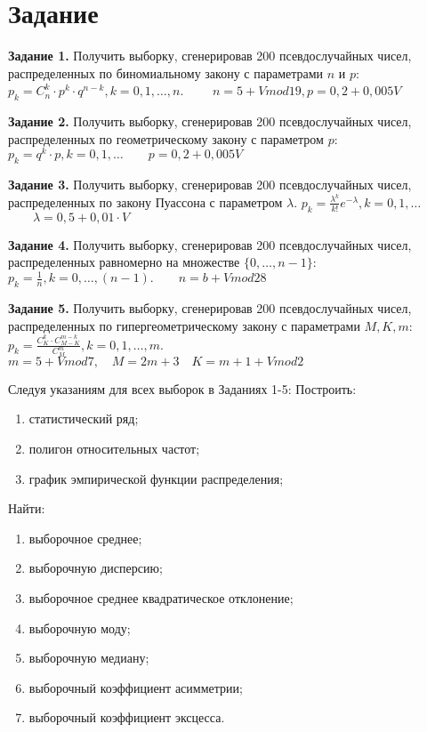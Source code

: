 \section{Задание}

\textbf{Задание 1.} Получить выборку, сгенерировав 200 псевдослучайных чисел, 
распределенных по биномиальному закону с
параметрами $n$ и $p$:\\
$p_k=C_{n}^{k} \cdot p^k \cdot q^{n-k}, k=0,1, \dots, n.$  
$\qquad n = 5 + V mod 19, p =0,2 + 0,005V$

\textbf{Задание 2.} Получить выборку, сгенерировав 200 псевдослучайных чисел, 
распределенных по геометрическому закону с параметром $p$:\\ 
$p_k = q^k \cdot p, k = 0,1, \dots \qquad p = 0,2 + 0,005V$

\textbf{Задание 3.} Получить выборку, сгенерировав 200 псевдослучайных чисел, 
распределенных по закону Пуассона с параметром $\lambda$. 
$p_k = \frac{\lambda^{k}}{k!} e^{-\lambda}, k =0,1, \dots$ 
$\qquad \lambda = 0,5 + 0,01 \cdot V$

\textbf{Задание 4.} Получить выборку, сгенерировав 200 псевдослучайных чисел, 
распределенных равномерно на множестве $\{ 0, \dots , n-1 \}$: \\
$p_k = \frac{1}{n}, k=0, \dots , (n-1). \qquad n = b + V mod 28$

\textbf{Задание 5.} Получить выборку, сгенерировав 200 псевдослучайных чисел, 
распределенных по гипергеометрическому закону с параметрами $M, K, m$: \\ 
$p_k = \frac{C_{K}^k \cdot C_{M-K}^{m-k}}{C_{M}^m} , k = 0,1, \dots , m . \qquad$
$m = 5+V mod 7, \quad M = 2m+3 \quad K=m+1+Vmod 2$

Следуя указаниям для всех выборок в Заданиях 1-5:
Построить:
\begin{enumerate}[label=\arabic*)]
	\item статистический ряд;
	\item полигон относительных частот;
	\item график эмпирической функции распределения;
\end{enumerate}

Найти:
\begin{enumerate}[label=\arabic*)]
	\item выборочное среднее;
	\item выборочную дисперсию;
	\item выборочное среднее квадратическое отклонение;
	\item выборочную моду;
	\item выборочную медиану;
	\item выборочный коэффициент асимметрии;
	\item выборочный коэффициент эксцесса.
\end{enumerate}

